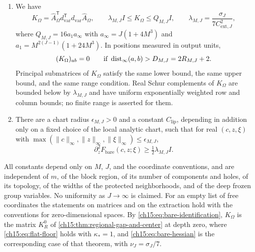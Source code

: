 \begin{lemma}
\begin{enumerate}
\begin{equation}
\end{equation}
with $\sigma_J$, $B_{\mathrm{ext}}$, and $C_{\mathrm{ext},J}$ as in \cref{ch15:lem:patch-coercivity}.
\item We have
\begin{equation}\label{ch15:eq:bare-hessian}
 K_\Omega=\widehat A_\Omega^{\mathsf T}d_{\mathrm{var}}^{\mathsf T}
                           d_{\mathrm{var}}\widehat A_\Omega,
 \qquad
 \lambda_{M,J}I\le K_\Omega\le Q_{M,J}I,
 \qquad
 \lambda_{M,J}=\frac{\sigma_J}{7C_{\mathrm{ext},J}^2},
\end{equation}
where $Q_{M,J}=16a_1a_\infty$ with $a_\infty=J(1+4M^3)$ and $a_1=M^{2(J-1)}(1+24M^3)$. In positions measured in output units,
\begin{equation}\label{ch15:eq:bare-range}
 (K_\Omega)_{ab}=0\qquad\text{if }\operatorname{dist}_\infty(a,b)>D_{M,J}=2R_{M,J}+2 .
\end{equation}
Principal submatrices of $K_\Omega$ satisfy the same lower bound, the same upper bound, and the same range condition. Real Schur complements of $K_\Omega$ are bounded below by $\lambda_{M,J}$ and have uniform exponentially weighted row and column bounds; no finite range is asserted for them.
\item There are a chart radius $\epsilon_{M,J}>0$ and a constant $C_{\mathrm{lip}}$, depending in addition only on a fixed choice of the local analytic chart, such that for real $(c,z,\xi)$ with $\max(\|c\|_\infty,\|z\|_\infty,\|\xi\|_\infty)\le\epsilon_{M,J}$,
\begin{equation}\label{ch15:eq:bare-small-data}
 \partial_z^2F_{\mathrm{bare}}(c,z;\xi)\ge\tfrac12\lambda_{M,J}I .
\end{equation}
\end{enumerate}
All constants depend only on $M$, $J$, and the coordinate conventions, and are independent of $m$, of the block region, of its number of components and holes, of its topology, of the widths of the protected neighborhoods, and of the deep frozen group variables. No uniformity as $J\to\infty$ is claimed. For an empty list of free coordinates the statements on matrices and on the extraction hold with the conventions for zero-dimensional spaces. By \eqref{ch15:eq:bare-identification}, $K_\Omega$ is the matrix $K_R^0$ of \cref{ch15:thm:regional-gap-and-center} at depth zero, where \eqref{ch15:eq:flat-floor} holds with $\kappa_*=1$, and \eqref{ch15:eq:bare-hessian} is the corresponding case of that theorem, with $\nu_J=\sigma_J/7$.
\end{lemma}

